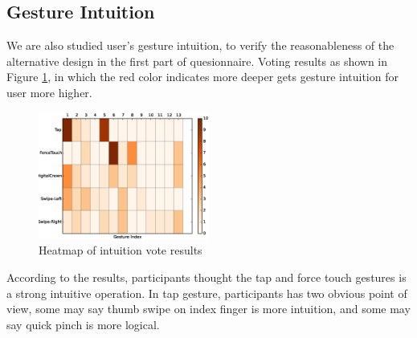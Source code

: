 \subsection{Gesture Intuition}

We are also studied user's gesture intuition, to verify the reasonableness of the alternative design in the first part of quesionnaire. Voting results as shown in Figure \ref{fig:heat}, in which the red color indicates more deeper gets gesture intuition for user more higher.

\begin{figure}[H]
    \kaishu
    \centering
    \includegraphics[width=0.5\textwidth]{figures/heat}
    \caption{\kaishu Heatmap of intuition vote results}
    \label{fig:heat}
\end{figure}

According to the results, participants thought the tap and force touch gestures is a strong intuitive operation. In tap gesture, participants has two obvious point of view, some may say thumb swipe on index finger is more intuition, and some may say quick pinch is more logical.

